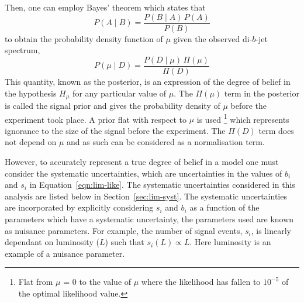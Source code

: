 \noindent
Then, one can employ Bayes' theorem which states that
\begin{equation}
  P(A \mid B) = \frac{P(B \mid A) \, P(A)}{P(B)}
\end{equation}
to obtain the probability density function of $\mu$ given the observed di-$b$-jet spectrum,
\begin{equation}
  P(\mu \mid D) = \frac{ P(D \mid \mu) \, \Pi( \mu ) }{ \Pi( D ) }
  \label{eq:lim-conf_statOnly}
\end{equation}
This quantity, known as the posterior, is an expression of the degree of belief in the hypothesis
$H_\mu$ for any particular value of $\mu$.
The $\Pi( \mu )$ term in the posterior %
is called the signal prior
and gives the probability density of $\mu$ before the experiment took place.
A prior flat with respect to $\mu$ is used
\footnote{Flat from $\mu$ = 0 to the value of $\mu$ where the
likelihood has fallen to $10^{-5}$ of the optimal likelihood value.}
which represents ignorance to the size of the signal before the experiment.
The $\Pi(D)$ term does not depend on $\mu$ and as such can be considered as a normalisation term.

However, to accurately represent a true degree of belief in a model one must consider the systematic uncertainties,
which are uncertainties in the values of $b_i$ and $s_i$ in Equation~\ref{eqn:lim-like}.
The systematic uncertainties considered in this analysis are listed below in Section~\ref{sec:lim-syst}.
The systematic uncertainties are incorporated by explicitly considering $s_i$ and $b_i$ as a
function of the parameters which have a systematic uncertainty,
the parameters used are known as nuisance parameters.
For example, the number of signal events, $s_i$, is linearly dependant on luminosity ($L$) such that $s_i(L) \propto L$.
Here luminosity is an example of a nuisance parameter.

